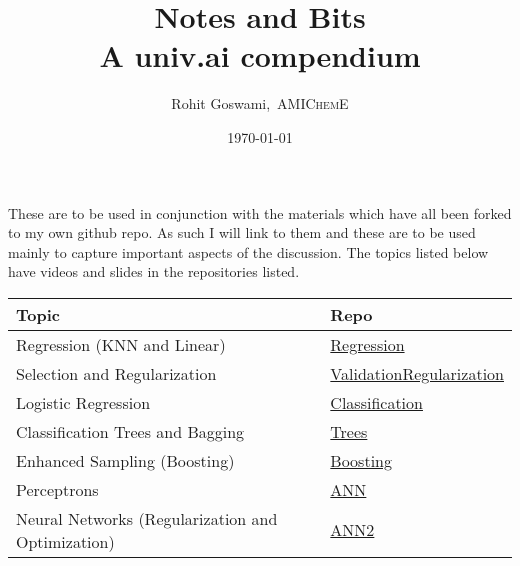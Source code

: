 \documentclass[12pt,a4paper,oneside,headinclude]{scrartcl}
\author{Rohit Goswami,\textsc{\scriptsize\ AMIChemE}}
\date{\today}
\title{Notes and Bits\\\medskip
\large A univ.ai compendium}
\numberwithin{figure}{section}
\numberwithin{equation}{section}
\numberwithin{table}{section}
\begin{document}
\begin{titlepage}
\afterpage{\restorepagecolor}
\newcommand{\colorRule}[3][black]{\textcolor[HTML]{#1}{\rule{#2}{#3}}}
\end{titlepage}
\restoregeometry

\tableofcontents
\newpage

These are to be used in conjunction with the materials which have all been
forked to my own github repo. As such I will link to them and these are to be
used mainly to capture important aspects of the discussion. The topics listed
below have videos and slides in the repositories listed.

\begin{center}
\begin{tabular}{ll}
Topic & Repo\\
\hline
Regression (KNN and Linear) & \href{https://github.com/univai-summerschool-2019/Regression}{Regression}\\
Selection and Regularization & \href{https://github.com/univai-summerschool-2019/ValidationRegularization}{ValidationRegularization}\\
Logistic Regression & \href{https://github.com/univai-summerschool-2019/Classification}{Classification}\\
Classification Trees and Bagging & \href{https://github.com/univai-summerschool-2019/Trees}{Trees}\\
Enhanced Sampling (Boosting) & \href{https://github.com/univai-summerschool-2019/Boosting}{Boosting}\\
Perceptrons & \href{https://github.com/univai-summerschool-2019/ANN}{ANN}\\
Neural Networks (Regularization and Optimization) & \href{https://github.com/univai-summerschool-2019/ANN2}{ANN2}\\
\end{tabular}
\end{center}
\end{document}
